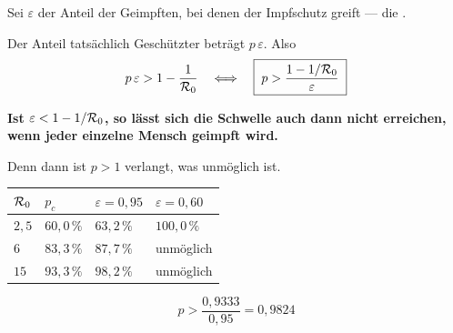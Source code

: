 \begin{warnung}
Sei $\varepsilon$ der Anteil der Geimpften, bei denen der Impfschutz greift --- die .

Der Anteil tatsächlich Geschützter beträgt $p\,\varepsilon$. Also
\[ p\,\varepsilon > 1 - \frac{1}{\mathcal{R}_0} \quad\Longleftrightarrow\quad \boxed{\;p > \frac{1 - 1/\mathcal{R}_0}{\varepsilon}\;} \]

\begin{center}
\begin{minipage}{0.9\textwidth}
\textbf{Ist $\varepsilon < 1 - 1/\mathcal{R}_0$, so lässt sich die Schwelle auch dann nicht erreichen, wenn jeder einzelne Mensch geimpft wird.}
\end{minipage}
\end{center}

Denn dann ist $p > 1$ verlangt, was unmöglich ist.

\begin{center}
{\small
\renewcommand{\arraystretch}{1.48}
\begin{tabular}{@{}P{1.8cm}P{1.6cm}P{2.2cm}P{2.4cm}@{}}
\toprule
$\mathcal{R}_0$ & $p_c$ & $\varepsilon = 0{,}95$ & $\varepsilon = 0{,}60$\\
\midrule
$2{,}5$ & $60{,}0\,\%$ & $63{,}2\,\%$ & $100{,}0\,\%$\\
$6$ & $83{,}3\,\%$ & $87{,}7\,\%$ & \textcolor{akzent}{unmöglich}\\
$15$ & $93{,}3\,\%$ & $98{,}2\,\%$ & \textcolor{akzent}{unmöglich}\\
\bottomrule
\end{tabular}}
\end{center}

\[ p > \frac{0{,}9333}{0{,}95} = 0{,}9824 \]

\begin{center}
\begin{minipage}{0.88\textwidth}
\end{minipage}
\end{center}
\end{warnung}

